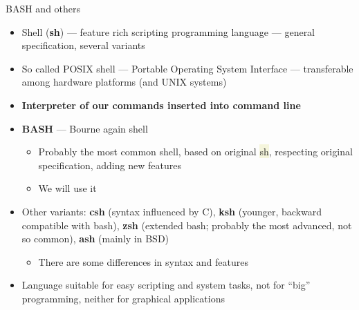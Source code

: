 \documentclass[compress, xelatex, 11pt, xcolor=svgnames, aspectratio=169, url={hyphens, lowtilde}]{beamer}
\renewcommand{\texttt}[1]{\colorbox{Beige}{{\ttfamily #1}}}
\begin{document}
\begin{frame}{BASH and others}
	\begin{itemize}
		\item Shell (\textbf{sh}) --- feature rich scripting programming language --- general specification, several variants
		\item So called POSIX shell --- Portable Operating System Interface --- transferable among hardware platforms (and UNIX systems)
		\item \textbf{Interpreter of our commands inserted into command line}
		\item \textbf{BASH} --- Bourne again shell
		\begin{itemize}
			\item Probably the most common shell, based on original \texttt{sh}, respecting original specification, adding new features
			\item We will use it
		\end{itemize}
		\item Other variants: \textbf{csh} (syntax influenced by C), \textbf{ksh} (younger, backward compatible with bash), \textbf{zsh} (extended bash; probably the most advanced, not so common), \textbf{ash} (mainly in BSD)
		\begin{itemize}
		 \item There are some differences in syntax and features
		\end{itemize}
		\item Language suitable for easy scripting and system tasks, not for \enquote{big} programming, neither for graphical applications
	\end{itemize}
\end{frame}
\end{document}
